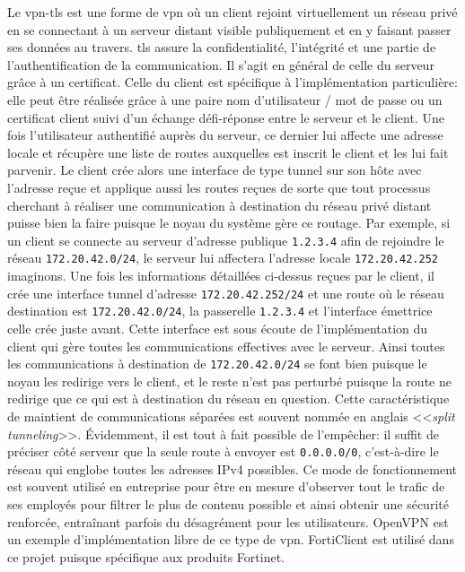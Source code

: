 \documentclass[12pt, oneside, a4paper, titlepage]{report}
\begin{document}
Le \gls{vpn-tls} est une forme de \gls{vpn} où un client rejoint virtuellement
un réseau privé en se connectant à un serveur distant visible publiquement et en
y faisant passer ses données au travers. \gls{tls} assure la confidentialité,
l'intégrité et une partie de l'authentification de la communication. Il s'agit
en général de celle du serveur grâce à un certificat. Celle du client est
spécifique à l'implémentation particulière: elle peut être réalisée grâce à une
paire nom d'utilisateur / mot de passe ou un certificat client suivi d'un
échange défi-réponse entre le serveur et le client. Une fois l'utilisateur
authentifié auprès du serveur, ce dernier lui affecte une adresse locale et
récupère une liste de routes auxquelles est inscrit le client et les lui fait
parvenir. Le client crée alors une interface de type tunnel sur son hôte avec
l'adresse reçue et applique aussi les routes reçues de sorte que tout processus
cherchant à réaliser une communication à destination du réseau privé distant
puisse bien la faire puisque le noyau du système gère ce routage. Par exemple,
si un client se connecte au serveur d'adresse publique \texttt{1.2.3.4} afin de
rejoindre le réseau \texttt{172.20.42.0/24}, le serveur lui affectera l'adresse
locale \texttt{172.20.42.252} imaginons. Une fois les informations détaillées
ci-dessus reçues par le client, il crée une interface tunnel d'adresse
\texttt{172.20.42.252/24} et une route où le réseau destination est
\texttt{172.20.42.0/24}, la passerelle \texttt{1.2.3.4} et l'interface émettrice
celle crée juste avant. Cette interface est sous écoute de l'implémentation du
client qui gère toutes les communications effectives avec le serveur. Ainsi
toutes les communications à destination de \texttt{172.20.42.0/24} se font bien
puisque le noyau les redirige vers le client, et le reste n'est pas perturbé
puisque la route ne redirige que ce qui est à destination du réseau en question.
Cette caractéristique de maintient de communications séparées est souvent nommée
en anglais <<\textit{split tunneling}>>.  Évidemment, il est tout à fait
possible de l'empêcher: il suffit de préciser côté serveur que la seule route à
envoyer est \texttt{0.0.0.0/0}, c'est-à-dire le réseau qui englobe toutes les
adresses IPv4 possibles. Ce mode de fonctionnement est souvent utilisé en
entreprise pour être en mesure d'observer tout le trafic de ses employés pour
filtrer le plus de contenu possible et ainsi obtenir une sécurité renforcée,
entraînant parfois du désagrément pour les utilisateurs. OpenVPN est un exemple
d'implémentation libre de ce type de \gls{vpn}. FortiClient est utilisé dans ce
projet puisque spécifique aux produits Fortinet.
\end{document}
